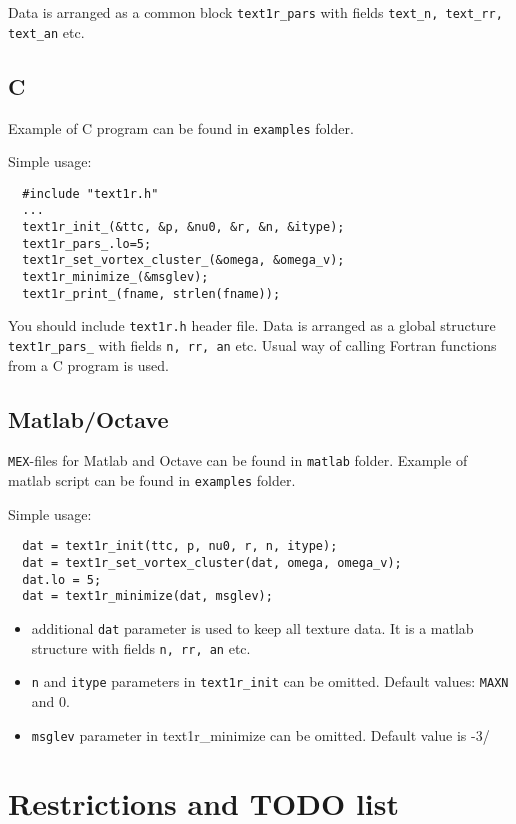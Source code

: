 \documentclass[a4paper]{article}
\begin{document}
Data is arranged as a common block {\tt text1r\_pars} with
fields {\tt text\_n, text\_rr, text\_an} etc.

\subsection*{C}
Example of C program can be found in {\tt examples} folder.

Simple usage:
\begin{verbatim}
  #include "text1r.h"
  ...
  text1r_init_(&ttc, &p, &nu0, &r, &n, &itype);
  text1r_pars_.lo=5;
  text1r_set_vortex_cluster_(&omega, &omega_v);
  text1r_minimize_(&msglev);
  text1r_print_(fname, strlen(fname));
\end{verbatim}

You should include {\tt text1r.h} header file. Data is arranged as a
global structure {\tt text1r\_pars\_} with fields {\tt n, rr, an} etc. Usual
way of calling Fortran functions from a C program is used.

\subsection*{Matlab/Octave}
{\tt MEX}-files for Matlab and Octave can be found in {\tt matlab} folder.
Example of matlab script can be found in {\tt examples} folder.

Simple usage:
\begin{verbatim}
  dat = text1r_init(ttc, p, nu0, r, n, itype);
  dat = text1r_set_vortex_cluster(dat, omega, omega_v);
  dat.lo = 5;
  dat = text1r_minimize(dat, msglev);
\end{verbatim}

\begin{itemize}
\item additional {\tt dat} parameter is used to keep all texture data. It
is a matlab structure with fields {\tt n, rr, an} etc.

\item {\tt n} and {\tt itype} parameters in {\tt text1r\_init} can be omitted.
Default values: {\tt MAXN} and 0.

\item {\tt msglev} parameter in {text1r\_minimize} can be omitted.
Default value is -3/

\end{itemize}


\section*{Restrictions and TODO list}
\end{document}
